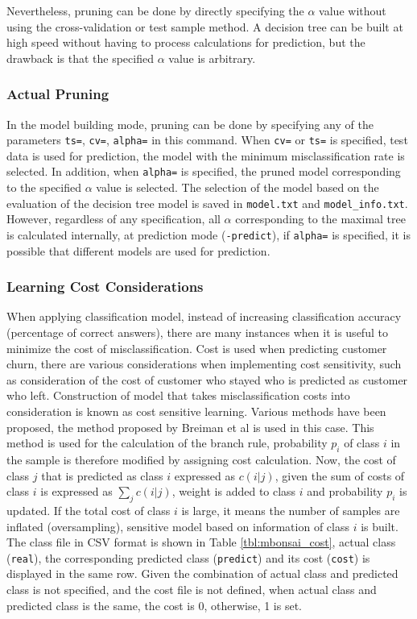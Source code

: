 Nevertheless, pruning can be done by directly specifying the $\alpha$ value without using the cross-validation or test sample method. A decision tree can be built at high speed without having to process calculations for prediction, but the drawback is that the specified $\alpha$ value is arbitrary. 



\subsubsection{Actual Pruning }
In the model building mode, pruning can be done by specifying any of the parameters \verb|ts=|, \verb|cv=|, \verb|alpha=| in this command. When \verb|cv=| or \verb|ts=| is specified, test data is used for prediction, the model with the minimum misclassification rate is selected. In addition, when \verb|alpha=| is specified, the pruned model corresponding to the specified $\alpha$ value is selected. The selection of the model based on the evaluation of the decision tree model is saved in \verb|model.txt| and \verb|model_info.txt|. However,  regardless of any specification, all $\alpha$ corresponding to the maximal tree is calculated internally, at prediction mode (\verb|-predict|), if \verb|alpha=| is specified, it is possible that  different models are used for prediction.  


\subsubsection{Learning Cost Considerations }
When applying classification model, instead of increasing classification accuracy (percentage of correct answers), there are  many instances when it is useful to minimize the  cost of misclassification. Cost is used when predicting customer churn, there are various considerations when implementing cost sensitivity, such as consideration of the cost of customer who stayed who is predicted as customer who left. Construction of model that takes misclassification costs into consideration is known as cost sensitive learning. Various methods have been proposed, the method proposed by Breiman et al \cite{Breiman84} is used in this case. This method is used for the calculation of the branch rule, probability $p_i$ of class $i$ in the sample is therefore modified by assigning cost calculation. Now, the cost of class $j$ that is predicted as class $i$ expressed as $c(i|j)$, given the sum of costs of class $i$ is expressed as $\sum_{j}c(i|j)$, weight is added to class $i$ and probability $p_i$ is updated. If the total cost of class $i$ is large, it means the number of samples are inflated (oversampling), sensitive model based on information of class $i$ is built. The class file in CSV format is shown in Table \ref{tbl:mbonsai_cost}, actual class (\verb|real|), the corresponding predicted class (\verb|predict|) and its cost (\verb|cost|) is displayed in the same row. Given the combination of actual class and predicted class is not specified, and the cost file is not defined, when actual class and predicted class is the same, the cost is 0, otherwise, 1 is set. 



